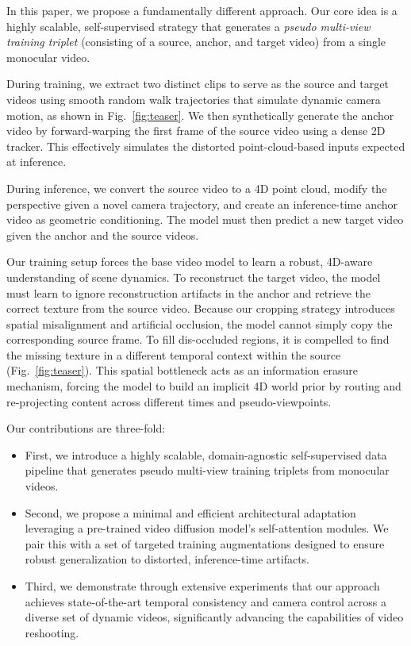 In this paper, we propose a fundamentally different approach. Our core idea is a highly scalable, self-supervised strategy that generates a \textit{pseudo multi-view training triplet} (consisting of a source, anchor, and target video) from a single monocular video.

During training, we extract two distinct clips to serve as the source and target videos using smooth random walk trajectories that simulate dynamic camera motion, as shown in Fig.~\ref{fig:teaser}. We then synthetically generate the anchor video by forward-warping the first frame of the source video using a dense 2D tracker. This effectively simulates the distorted point-cloud-based inputs expected at inference. 

During inference, we convert the source video to a 4D point cloud, modify the perspective given a novel camera trajectory, and create an inference-time anchor video as geometric conditioning. The model must then predict a new target video given the anchor and the source videos.

Our training setup forces the base video model to learn a robust, 4D-aware understanding of scene dynamics. To reconstruct the target video, the model must learn to ignore reconstruction artifacts in the anchor and retrieve the correct texture from the source video. Because our cropping strategy introduces spatial misalignment and artificial occlusion, the model cannot simply copy the corresponding source frame. To fill dis-occluded regions, it is compelled to find the missing texture in a different temporal context within the source (Fig.~\ref{fig:teaser}). This spatial bottleneck acts as an information erasure mechanism, forcing the model to build an implicit 4D world prior by routing and re-projecting content across different times and pseudo-viewpoints.

Our contributions are three-fold:
\begin{itemize}[noitemsep, topsep=0pt, partopsep=0pt]
    \item First, we introduce a highly scalable, domain-agnostic self-supervised data pipeline that generates pseudo multi-view training triplets from monocular videos.
    \item Second, we propose a minimal and efficient architectural adaptation leveraging a pre-trained video diffusion model's self-attention modules. We pair this with a set of targeted training augmentations designed to ensure robust generalization to distorted, inference-time artifacts.
    \item Third, we demonstrate through extensive experiments that our approach achieves state-of-the-art temporal consistency and camera control across a diverse set of dynamic videos, significantly advancing the capabilities of video reshooting.
\end{itemize}
